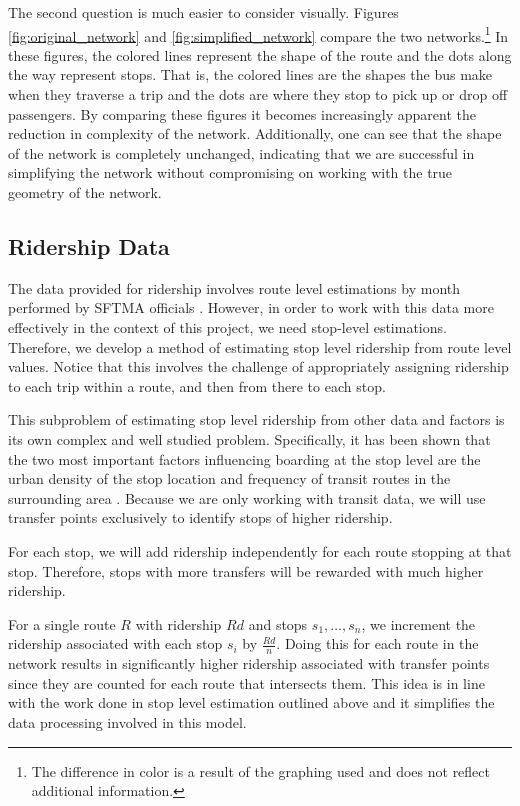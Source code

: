 \documentclass[11pt]{amsart}
\theoremstyle{definition}                  %
\theoremstyle{remark}                       %
\numberwithin{equation}{section}
\begin{document}
The second question is much easier to consider visually. Figures \ref{fig:original_network} and \ref{fig:simplified_network} compare the two networks.\footnote{The difference in color is a result of the graphing used and does not reflect additional information.} In these figures, the colored lines represent the shape of the route and the dots along the way represent stops. That is, the colored lines are the shapes the bus make when they traverse a trip and the dots are where they stop to pick up or drop off passengers. By comparing these figures it becomes increasingly apparent the reduction in complexity of the network. Additionally, one can see that the shape of the network is completely unchanged, indicating that we are successful in simplifying the network without compromising on working with the true geometry of the network. 

\subsection{Ridership Data}
The data provided for ridership involves route level estimations by month performed by SFTMA officials \cite{SFMTA}. However, in order to work with this data more effectively in the context of this project, we need stop-level estimations. Therefore, we develop a method of estimating stop level ridership from route level values. Notice that this involves the challenge of appropriately assigning ridership to each trip within a route, and then from there to each stop. 

This subproblem of estimating stop level ridership from other data and factors is its own complex and well studied problem. Specifically, it has been shown that the two most important factors influencing boarding at the stop level are the urban density of the stop location and frequency of transit routes in the surrounding area \cite{baek2016, gutierrez2011}. Because we are only working with transit data, we will use transfer points exclusively to identify stops of higher ridership. 

For each stop, we will add ridership independently for each route stopping at that stop. Therefore, stops with more transfers will be rewarded with much higher ridership.  

For a single route $R$ with ridership $Rd$ and stops $s_1, \ldots, s_n$, we increment the ridership associated with each stop $s_i$ by $\frac{Rd}{n}$. Doing this for each route in the network results in significantly higher ridership associated with transfer points since they are counted for each route that intersects them. This idea is in line with the work done in stop level estimation outlined above and it simplifies the data processing involved in this model.
\end{document}
